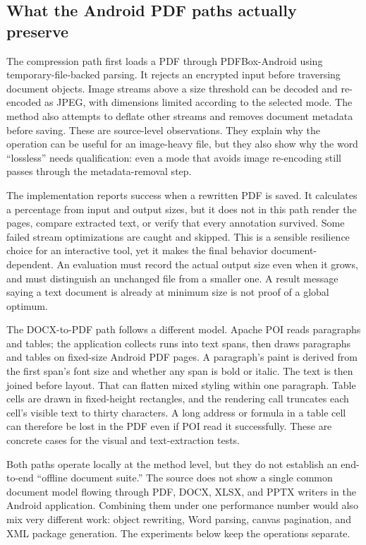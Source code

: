 \documentclass[10pt,letterpaper]{article}
\begin{document}
\subsection{What the Android PDF paths actually preserve}

The compression path first loads a PDF through PDFBox-Android using temporary-file-backed parsing. It rejects an encrypted input before traversing document objects. Image streams above a size threshold can be decoded and re-encoded as JPEG, with dimensions limited according to the selected mode. The method also attempts to deflate other streams and removes document metadata before saving. These are source-level observations. They explain why the operation can be useful for an image-heavy file, but they also show why the word ``lossless'' needs qualification: even a mode that avoids image re-encoding still passes through the metadata-removal step.

The implementation reports success when a rewritten PDF is saved. It calculates a percentage from input and output sizes, but it does not in this path render the pages, compare extracted text, or verify that every annotation survived. Some failed stream optimizations are caught and skipped. This is a sensible resilience choice for an interactive tool, yet it makes the final behavior document-dependent. An evaluation must record the actual output size even when it grows, and must distinguish an unchanged file from a smaller one. A result message saying a text document is already at minimum size is not proof of a global optimum.

The DOCX-to-PDF path follows a different model. Apache POI reads paragraphs and tables; the application collects runs into text spans, then draws paragraphs and tables on fixed-size Android PDF pages. A paragraph's paint is derived from the first span's font size and whether any span is bold or italic. The text is then joined before layout. That can flatten mixed styling within one paragraph. Table cells are drawn in fixed-height rectangles, and the rendering call truncates each cell's visible text to thirty characters. A long address or formula in a table cell can therefore be lost in the PDF even if POI read it successfully. These are concrete cases for the visual and text-extraction tests.

Both paths operate locally at the method level, but they do not establish an end-to-end ``offline document suite.'' The source does not show a single common document model flowing through PDF, DOCX, XLSX, and PPTX writers in the Android application. Combining them under one performance number would also mix very different work: object rewriting, Word parsing, canvas pagination, and XML package generation. The experiments below keep the operations separate.
\end{document}
